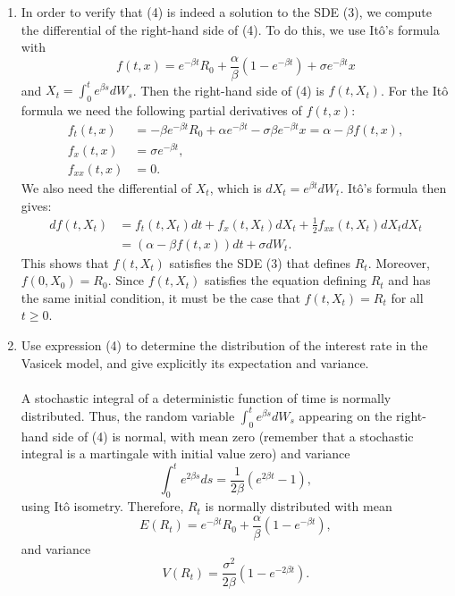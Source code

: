 \documentclass[11pt,a4,table]{article}
\begin{document}
\begin{enumerate}
    \begin{enumerate}
        \item In order to verify that (4) is indeed a solution to the SDE (3), we compute the differential of the right-hand side of (4). To do this, we use Itô's formula with
        \begin{equation*}
            f(t,x) = e^{-\beta t}R_0 + \frac{\alpha}{\beta}(1-e^{-\beta t}) + \sigma e^{-\beta t}x
        \end{equation*}
        and $X_t=\int_0^t e^{\beta s} dW_s$. Then the right-hand side of (4) is $f(t,X_t)$. For the Itô formula we need the following partial derivatives of $f(t,x)$:
        \begin{align*}
            f_t(t,x) &= -\beta e^{-\beta t}R_0 + \alpha e^{-\beta t} - \sigma\beta e^{-\beta t}x=\alpha -\beta f(t,x),\\
            f_x(t,x) &= \sigma e^{-\beta t},\\
            f_{xx}(t,x) &= 0.
        \end{align*}
        We also need the differential of $X_t$, which is $dX_t = e^{\beta t} dW_t$. Itô's formula then gives:
        \begin{align*}
            df(t,X_t) &= f_t(t,X_t) dt + f_x(t,X_t) dX_t + \frac{1}{2}f_{xx}(t,X_t) dX_t dX_t\\
            &= (\alpha-\beta f(t,x)) dt + \sigma dW_t.
        \end{align*}
        This shows that $f(t,X_t)$ satisfies the SDE (3) that defines $R_t$. Moreover, $f(0,X_0)=R_0$. Since $f(t,X_t)$ satisfies the equation defining $R_t$ and has the same initial condition, it must be the case that $f(t,X_t) = R_t$ for all $t\geq 0$.
        
        \item Use expression (4) to determine the distribution of the interest rate in the Vasicek model, and give explicitly its expectation and variance.\\\\
        A stochastic integral of a deterministic function of time is normally distributed. Thus, the random variable $\int_0^t e^{\beta s} dW_s$ appearing on the right-hand side of (4) is normal, with mean zero (remember that a stochastic integral is a martingale with initial value zero) and variance
        \begin{equation*}
            \int_0^t e^{2\beta s} ds = \frac{1}{2\beta}(e^{2\beta t}-1),
        \end{equation*}
        using Itô isometry. Therefore, $R_t$ is normally distributed with mean
        \begin{equation*}
            E(R_t) = e^{-\beta t}R_0 + \frac{\alpha}{\beta}(1-e^{-\beta t}),
        \end{equation*}
        and variance
        \begin{equation*}
            V(R_t) = \frac{\sigma^2}{2\beta}(1-e^{-2\beta t}).
        \end{equation*}
        

\end{enumerate}
\end{enumerate}
\end{document}
